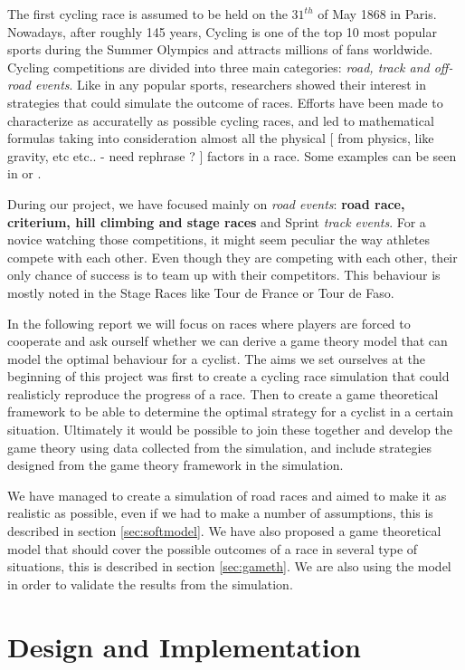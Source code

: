 \documentclass[10pt, a4paper]{report}
\begin{document}
The first cycling race is assumed to be held on the $31^{th}$ of May 1868 in Paris. Nowadays, after roughly 145 years, Cycling is one of the top 10 most popular sports during the Summer Olympics \cite{TopEndSportsUrl} and attracts millions of fans worldwide. Cycling competitions are divided into three main categories: \textit{road, track and off-road events}. Like in any popular sports, researchers showed their interest in strategies that could simulate the outcome of races. Efforts have been made to characterize as accuratelly as possible cycling races, and led to mathematical formulas taking into consideration almost all the physical [ from physics, like gravity, etc etc.. - need rephrase ? ] factors in a race. Some examples can be seen in \cite{AgentModel} or \cite{SlipStream} .

During our project, we have focused mainly on \textit{road events}: \textbf{road race, criterium, hill climbing and stage races} and Sprint \textit{track events}. For a novice watching those competitions, it might seem peculiar the way athletes compete with each other. Even though they are competing  with each other, their only chance of success is to team up with their competitors. This behaviour is mostly noted in the Stage Races like Tour de France or Tour de Faso.

In the following report we will focus on races where players are forced to cooperate and ask ourself  whether we can derive a game theory model that can model the optimal behaviour for a cyclist. The aims we set ourselves at the beginning of this project was first to create a cycling race simulation that could realisticly reproduce the progress of a race. Then to create a game theoretical framework to be able to determine the optimal strategy for a cyclist in a certain situation. Ultimately it would be possible to join these together and develop the game theory using data collected from the simulation, and include strategies designed from the game theory framework in the simulation.

We have managed to create a simulation of road races and aimed to make it as realistic as possible, even if we had to make a number of assumptions, this is described in section \ref{sec:softmodel}. We have also proposed a game theoretical model that should cover the possible outcomes of a race in several type of situations, this is described in section \ref{sec:gameth}. We are also using the model in order to validate the results from the simulation.


\chapter{Design and Implementation}\label{ch:design&impl}
\end{document}
